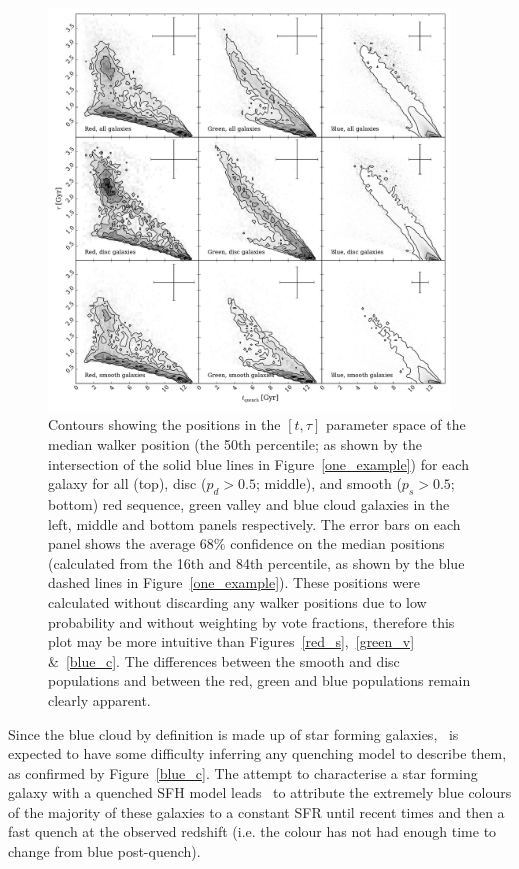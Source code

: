 \begin{figure}
\includegraphics[width=0.95\textwidth]{morphology/contour_t_tau_mcmc_bestfit.pdf}
\caption[Best fit contours for red, green and blue clean galaxies]{Contours showing the positions in the $[t, \tau]$ parameter space of the median walker position (the 50th percentile; as shown by the intersection of the solid blue lines in Figure~\ref{one_example}) for each galaxy for all (top), disc ($p_d > 0.5$; middle), and smooth ($p_s > 0.5$; bottom) red sequence, green valley and blue cloud galaxies in the left, middle and bottom panels respectively. The error bars on each panel shows the average $68\%$ confidence on the median positions (calculated from the 16th and 84th percentile, as shown by the blue dashed lines in Figure~\ref{one_example}). These positions were calculated without discarding any walker positions due to low probability and without weighting by vote fractions, therefore this plot may be more intuitive than Figures~\ref{red_s},~\ref{green_v} \&~\ref{blue_c}. The differences between the smooth and disc populations and between the red, green and blue populations remain clearly apparent.}
\label{fig:bestfit}
\end{figure}

Since the blue cloud by definition is made up of star forming galaxies, \starpy\ is expected to have some difficulty inferring any quenching model to describe them, as confirmed by Figure~\ref{blue_c}. The attempt to characterise a star forming galaxy with a quenched SFH model leads \starpy\ to attribute the extremely blue colours of the majority of these galaxies to a constant SFR until recent times and then a fast quench at the observed redshift (i.e. the colour has not had enough time to change from blue post-quench). 

